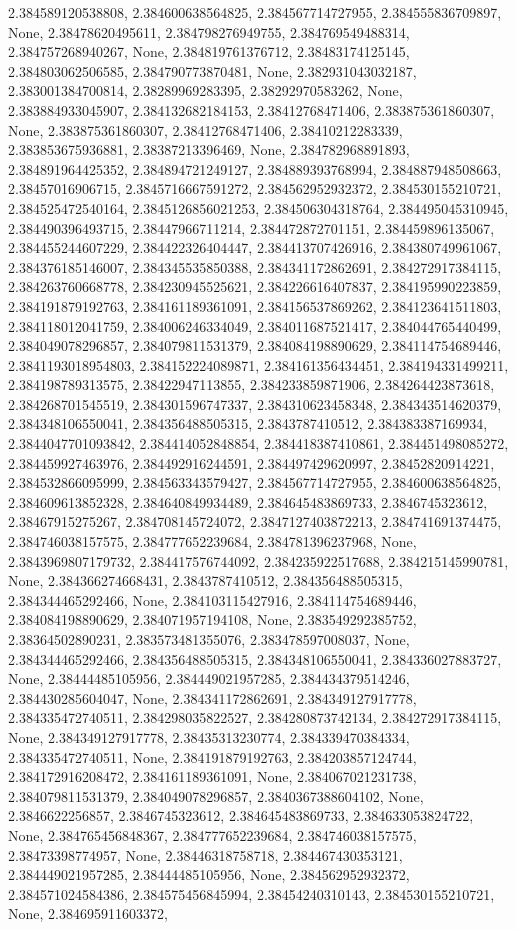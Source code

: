 \documentclass[
  11pt,
  french,
]{article}
\begin{document}
\begin{tcolorbox}[title= Répartition des volumes selon leurs caractéristiques ,colback=boitecode]
2.384589120538808, 2.384600638564825, 2.384567714727955, 2.384555836709897, None, 2.38478620495611, 2.384798276949755, 2.384769549488314, 2.384757268940267, None, 2.384819761376712, 2.38483174125145, 2.384803062506585, 2.384790773870481, None, 2.382931043032187, 2.383001384700814, 2.38289969283395, 2.38292970583262, None, 2.383884933045907, 2.384132682184153, 2.38412768471406, 2.383875361860307, None, 2.383875361860307, 2.38412768471406, 2.38410212283339, 2.383853675936881, 2.38387213396469, None, 2.384782968891893, 2.384891964425352, 2.384894721249127, 2.384889393768994, 2.384887948508663, 2.38457016906715, 2.3845716667591272, 2.384562952932372, 2.384530155210721, 2.384525472540164, 2.3845126856021253, 2.384506304318764, 2.384495045310945, 2.384490396493715, 2.38447966711214, 2.384472872701151, 2.384459896135067, 2.384455244607229, 2.384422326404447, 2.384413707426916, 2.384380749961067, 2.384376185146007, 2.384345535850388, 2.384341172862691, 2.384272917384115, 2.384263760668778, 2.384230945525621, 2.384226616407837, 2.384195990223859, 2.384191879192763, 2.384161189361091, 2.384156537869262, 2.384123641511803, 2.384118012041759, 2.384006246334049, 2.384011687521417, 2.384044765440499, 2.384049078296857, 2.384079811531379, 2.384084198890629, 2.384114754689446, 2.3841193018954803, 2.384152224089871, 2.384161356434451, 2.384194331499211, 2.384198789313575, 2.38422947113855, 2.384233859871906, 2.384264423873618, 2.384268701545519, 2.384301596747337, 2.384310623458348, 2.384343514620379, 2.384348106550041, 2.384356488505315, 2.3843787410512, 2.384383387169934, 2.3844047701093842, 2.384414052848854, 2.384418387410861, 2.384451498085272, 2.384459927463976, 2.384492916244591, 2.384497429620997, 2.38452820914221, 2.384532866095999, 2.384563343579427, 2.384567714727955, 2.384600638564825, 2.384609613852328, 2.384640849934489, 2.384645483869733, 2.3846745323612, 2.38467915275267, 2.384708145724072, 2.3847127403872213, 2.384741691374475, 2.384746038157575, 2.384777652239684, 2.384781396237968, None, 2.3843969807179732, 2.384417576744092, 2.384235922517688, 2.384215145990781, None, 2.384366274668431, 2.3843787410512, 2.384356488505315, 2.384344465292466, None, 2.384103115427916, 2.384114754689446, 2.384084198890629, 2.384071957194108, None, 2.383549292385752, 2.38364502890231, 2.383573481355076, 2.383478597008037, None, 2.384344465292466, 2.384356488505315, 2.384348106550041, 2.384336027883727, None, 2.38444485105956, 2.384449021957285, 2.384434379514246, 2.384430285604047, None, 2.384341172862691, 2.384349127917778, 2.384335472740511, 2.384298035822527, 2.384280873742134, 2.384272917384115, None, 2.384349127917778, 2.38435313230774, 2.384339470384334, 2.384335472740511, None, 2.384191879192763, 2.384203857124744, 2.384172916208472, 2.384161189361091, None, 2.384067021231738, 2.384079811531379, 2.384049078296857, 2.3840367388604102, None, 2.3846622256857, 2.3846745323612, 2.384645483869733, 2.384633053824722, None, 2.384765456848367, 2.384777652239684, 2.384746038157575, 2.38473398774957, None, 2.38446318758718, 2.384467430353121, 2.384449021957285, 2.38444485105956, None, 2.384562952932372, 2.384571024584386, 2.384575456845994, 2.38454240310143, 2.384530155210721, None, 2.384695911603372, 
\end{tcolorbox}
\end{document}
